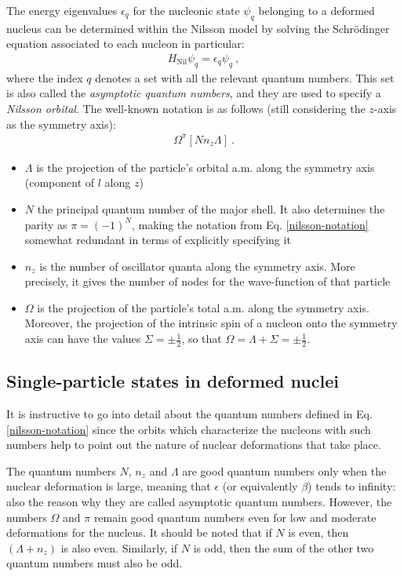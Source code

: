 The energy eigenvalues $\epsilon_q$ for the nucleonic state $\psi_q$ belonging to a deformed nucleus can be determined within the Nilsson model by solving the Schrödinger equation associated to each nucleon in particular:
\begin{align}
    H_\text{Nil}\psi_q=\epsilon_q\psi_q\ ,
    \label{nilsson-schrodiner-equation}
\end{align}
where the index $q$ denotes a set with all the relevant quantum numbers. This set is also called the \emph{asymptotic quantum numbers}, and they are used to specify a \emph{Nilsson orbital}. The well-known notation is as follows (still considering the $z$-axis as the symmetry axis):
\begin{align}
    \Omega^\pi\left[Nn_z\Lambda\right]\ .
    \label{nilsson-notation}
\end{align}
\begin{itemize}
    \item $\Lambda$ is the projection of the particle's orbital a.m. along the symmetry axis (component of $l$ along $z$)
    \item $N$ the principal quantum number of the major shell. It also determines the parity as $\pi=(-1)^N$, making the notation from Eq. \ref{nilsson-notation} somewhat redundant in terms of explicitly specifying it
    \item $n_z$ is the number of oscillator quanta along the symmetry axis. More precisely, it gives the number of nodes for the wave-function of that particle
    \item $\Omega$ is the projection of the particle's total a.m. along the symmetry axis. Moreover, the projection of the intrinsic spin of a nucleon onto the symmetry axis can have the values $\Sigma=\pm\frac{1}{2}$, so that $\Omega=\Lambda+\Sigma=\pm\frac{1}{2}$.
\end{itemize}

\subsection{Single-particle states in deformed nuclei}

It is instructive to go into detail about the quantum numbers defined in Eq. \ref{nilsson-notation} since the orbits which characterize the nucleons with such numbers help to point out the nature of nuclear deformations that take place.

The quantum numbers $N$, $n_z$ and $\Lambda$ are good quantum numbers only when the nuclear deformation is large, meaning that $\epsilon$ (or equivalently $\beta$) tends to infinity: also the reason why they are called asymptotic quantum numbers. However, the numbers $\Omega$ and $\pi$ remain good quantum numbers even for low and moderate deformations for the nucleus. It should be noted that if $N$ is even, then $(\Lambda+n_z)$ is also even. Similarly, if $N$ is odd, then the sum of the other two quantum numbers must also be odd.

